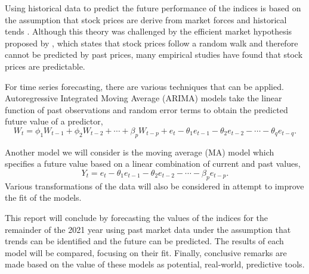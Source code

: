 \documentclass[12pt, centerh1]{article}
\begin{document}
Using historical data to predict the future performance of the indices is based on the assumption that stock prices are derive from market forces and historical tends \citep{levy1967relative}. Although this theory was challenged by the efficient market hypothesis proposed by \citet{malkiel2003efficient}, which states that stock prices follow a random walk and therefore cannot be predicted by past prices, many empirical studies have found that stock prices are predictable.


For time series forecasting, there are various techniques that can be applied. Autoregressive Integrated Moving Average (ARIMA) models take the linear function of past observations and random error terms to obtain the predicted future value of a predictor,
\begin{equation}
        W_t = \phi_1W_{t-1} + \phi_2W_{t-2} + \cdots + \beta_pW_{t-p} + e_t - \theta_1e_{t-1} - \theta_2e_{t-2} - \cdots - \theta_qe_{t-q}. \label{eq:ARIMA}
\end{equation}

Another model we will consider is the moving average (MA) model which specifies a future value based on a linear combination of current and past values,
\begin{equation}
    Y_t = e_t - \theta_1e_{t-1} - \theta_2e_{t-2} - \cdots - \beta_pe_{t-p}\label{eq:MA}.
\end{equation}
Various transformations of the data will also be considered in attempt to improve the fit of the models. 


This report will conclude by forecasting the values of the indices for the remainder of the 2021 year using past market data under the assumption that trends can be identified and the future can be predicted. The results of each model will be compared, focusing on their fit. Finally, conclusive remarks are made based on the value of these models as potential, real-world, predictive tools.
\end{document}
